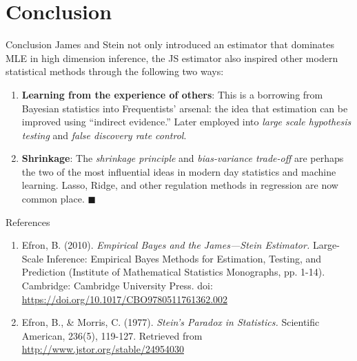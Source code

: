 \documentclass{beamer}
\begin{document}
\section{Conclusion}

\begin{frame}{Conclusion}
	James and Stein not only introduced an estimator that dominates MLE in high
	dimension inference, the JS estimator also inspired other modern
	statistical methods through the following two ways:
	\begin{enumerate}
		\item \textbf{Learning from the experience of others}:
			This is a borrowing from Bayesian statistics into Frequentists'
			arsenal: the idea that estimation can be improved using
			``indirect evidence.''
			Later employed into \emph{large scale hypothesis testing} and
			\emph{false discovery rate control}.
		\item \textbf{Shrinkage}:
			The \emph{shrinkage principle} and \emph{bias-variance trade-off}
			are perhaps the two of the most influential ideas in modern day
			statistics and machine learning.  Lasso, Ridge, and other
			regulation methods in regression are now common place.
			\hfill$\blacksquare$
	\end{enumerate}
\end{frame}

\begin{frame}{References}
	\begin{enumerate}
		\item
			Efron, B. (2010).
			\textit{Empirical Bayes and the James—Stein Estimator.}
			Large-Scale Inference:
			Empirical Bayes Methods for Estimation, Testing, and Prediction
			(Institute of Mathematical Statistics Monographs, pp. 1-14).
			Cambridge: Cambridge University Press.
			doi: \url{https://doi.org/10.1017/CBO9780511761362.002}
		\item
			Efron, B., \& Morris, C. (1977).
			\textit{Stein's Paradox in Statistics.}
			Scientific American, 236(5), 119-127.
			Retrieved from \url{http://www.jstor.org/stable/24954030}
	\end{enumerate}
\end{frame}
\end{document}
